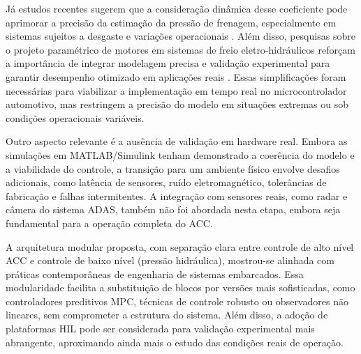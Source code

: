 Já estudos recentes sugerem que a consideração dinâmica desse coeficiente pode aprimorar a precisão da estimação da pressão de frenagem, especialmente em sistemas sujeitos a desgaste e variações operacionais \cite{ZhangWang2021}. Além disso, pesquisas sobre o projeto paramétrico de motores em sistemas de freio eletro-hidráulicos reforçam a importância de integrar modelagem precisa e validação experimental para garantir desempenho otimizado em aplicações reais \cite{MotorParametricDesign2023}. Essas simplificações foram necessárias para viabilizar a implementação em tempo real no microcontrolador automotivo, mas restringem a precisão do modelo em situações extremas ou sob condições operacionais variáveis.

Outro aspecto relevante é a ausência de validação em hardware real. Embora as simulações em MATLAB/Simulink tenham demonstrado a coerência do modelo e a viabilidade do controle, a transição para um ambiente físico envolve desafios adicionais, como latência de sensores, ruído eletromagnético, tolerâncias de fabricação e falhas intermitentes. A integração com sensores reais, como radar e câmera do sistema ADAS, também não foi abordada nesta etapa, embora seja fundamental para a operação completa do ACC.

A arquitetura modular proposta, com separação clara entre controle de alto nível ACC e controle de baixo nível (pressão hidráulica), mostrou-se alinhada com práticas contemporâneas de engenharia de sistemas embarcados. Essa modularidade facilita a substituição de blocos por versões mais sofisticadas, como controladores preditivos MPC, técnicas de controle robusto ou observadores não lineares, sem comprometer a estrutura do sistema. Além disso, a adoção de plataformas HIL pode ser considerada para validação experimental mais abrangente, aproximando ainda mais o estudo das condições reais de operação.




